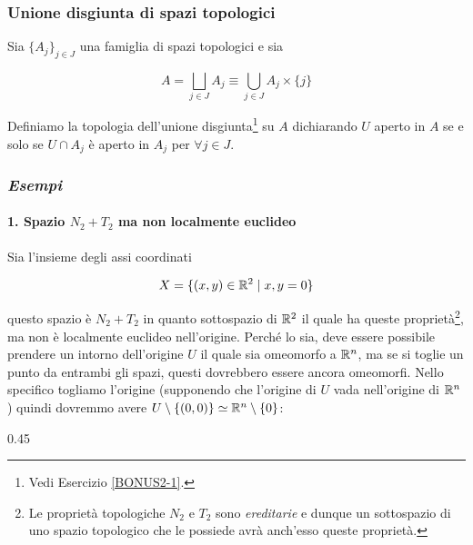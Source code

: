 \subsubsection{Unione disgiunta di spazi topologici}

Sia $ \{A_{j}\}_{j \in J} $ una famiglia di spazi topologici e sia

\begin{equation}
		A = \bigsqcup_{j \in J} A_{j} \equiv \bigcup_{j \in J} A_{j} \times \{j\}
\end{equation}

Definiamo la topologia dell'unione disgiunta\footnote{%
	Vedi Esercizio \ref{BONUS2-1}.%
} su $ A $ dichiarando $ U $ aperto in $ A $ se e solo se $ U \cap A_{j} $ è aperto in $ A_{j} $ per $ \forall j \in J $.

\subsubsection{\textit{Esempi}}

\paragraph{1. Spazio $ N_{2} + T_{2} $ ma non localmente euclideo} 

Sia l'insieme degli assi coordinati

\begin{equation}
	X = \{ (x,y) \in \mathbb{R}^{2} \mid x,y = 0 \}
\end{equation}

questo spazio è $ N_{2} + T_{2} $ in quanto sottospazio di $ \mathbb{R}^{2} $ il quale ha queste proprietà\footnote{%
	Le proprietà topologiche $ N_{2} $ e $ T_{2} $ sono \textit{ereditarie} e dunque un sottospazio di uno spazio topologico che le possiede avrà anch'esso queste proprietà.%
}, ma non è localmente euclideo nell'origine. Perché lo sia, deve essere possibile prendere un intorno dell'origine $ U $ il quale sia omeomorfo a $ \mathbb{R}^{n} $, ma se si toglie un punto da entrambi gli spazi, questi dovrebbero essere ancora omeomorfi. Nello specifico togliamo l'origine (supponendo che l'origine di $ U $ vada nell'origine di $ \mathbb{R}^{n} $) quindi dovremmo avere $ U \setminus \{(0,0)\} \simeq \mathbb{R}^{n} \setminus \{0\} $:

	{0.45}{%
		}
	
